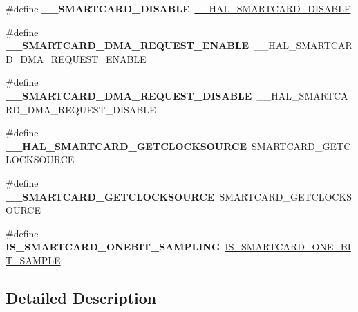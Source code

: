 \begin{DoxyCompactItemize}
\#define {\bfseries \+\_\+\+\_\+\+S\+M\+A\+R\+T\+C\+A\+R\+D\+\_\+\+D\+I\+S\+A\+B\+LE}~\hyperlink{group___s_m_a_r_t_c_a_r_d___exported___macros_gaeea5d27b1628195b28bb3f3fdf0b19bb}{\+\_\+\+\_\+\+H\+A\+L\+\_\+\+S\+M\+A\+R\+T\+C\+A\+R\+D\+\_\+\+D\+I\+S\+A\+B\+LE}
\item 
\mbox{\label{group___h_a_l___s_m_a_r_t_c_a_r_d___aliased___macros_ga758ec49e911579f65f7cb03e11cbf1b7}} 
\#define {\bfseries \+\_\+\+\_\+\+S\+M\+A\+R\+T\+C\+A\+R\+D\+\_\+\+D\+M\+A\+\_\+\+R\+E\+Q\+U\+E\+S\+T\+\_\+\+E\+N\+A\+B\+LE}~\+\_\+\+\_\+\+H\+A\+L\+\_\+\+S\+M\+A\+R\+T\+C\+A\+R\+D\+\_\+\+D\+M\+A\+\_\+\+R\+E\+Q\+U\+E\+S\+T\+\_\+\+E\+N\+A\+B\+LE
\item 
\mbox{\label{group___h_a_l___s_m_a_r_t_c_a_r_d___aliased___macros_gac7fcc6baa98b300ea02656c79c48b2a9}} 
\#define {\bfseries \+\_\+\+\_\+\+S\+M\+A\+R\+T\+C\+A\+R\+D\+\_\+\+D\+M\+A\+\_\+\+R\+E\+Q\+U\+E\+S\+T\+\_\+\+D\+I\+S\+A\+B\+LE}~\+\_\+\+\_\+\+H\+A\+L\+\_\+\+S\+M\+A\+R\+T\+C\+A\+R\+D\+\_\+\+D\+M\+A\+\_\+\+R\+E\+Q\+U\+E\+S\+T\+\_\+\+D\+I\+S\+A\+B\+LE
\item 
\mbox{\label{group___h_a_l___s_m_a_r_t_c_a_r_d___aliased___macros_ga94815bec2412334dadbc50408ff955f2}} 
\#define {\bfseries \+\_\+\+\_\+\+H\+A\+L\+\_\+\+S\+M\+A\+R\+T\+C\+A\+R\+D\+\_\+\+G\+E\+T\+C\+L\+O\+C\+K\+S\+O\+U\+R\+CE}~S\+M\+A\+R\+T\+C\+A\+R\+D\+\_\+\+G\+E\+T\+C\+L\+O\+C\+K\+S\+O\+U\+R\+CE
\item 
\mbox{\label{group___h_a_l___s_m_a_r_t_c_a_r_d___aliased___macros_gaba3d4f1525efcda959a2a468889af9d6}} 
\#define {\bfseries \+\_\+\+\_\+\+S\+M\+A\+R\+T\+C\+A\+R\+D\+\_\+\+G\+E\+T\+C\+L\+O\+C\+K\+S\+O\+U\+R\+CE}~S\+M\+A\+R\+T\+C\+A\+R\+D\+\_\+\+G\+E\+T\+C\+L\+O\+C\+K\+S\+O\+U\+R\+CE
\item 
\mbox{\label{group___h_a_l___s_m_a_r_t_c_a_r_d___aliased___macros_ga02c2a746784a8186a7a1fbbe452670d3}} 
\#define {\bfseries I\+S\+\_\+\+S\+M\+A\+R\+T\+C\+A\+R\+D\+\_\+\+O\+N\+E\+B\+I\+T\+\_\+\+S\+A\+M\+P\+L\+I\+NG}~\hyperlink{group___s_m_a_r_t_c_a_r_d___private___macros_ga101d1102ec58ebd00aef25f285898622}{I\+S\+\_\+\+S\+M\+A\+R\+T\+C\+A\+R\+D\+\_\+\+O\+N\+E\+\_\+\+B\+I\+T\+\_\+\+S\+A\+M\+P\+LE}
\end{DoxyCompactItemize}


\subsection{Detailed Description}
